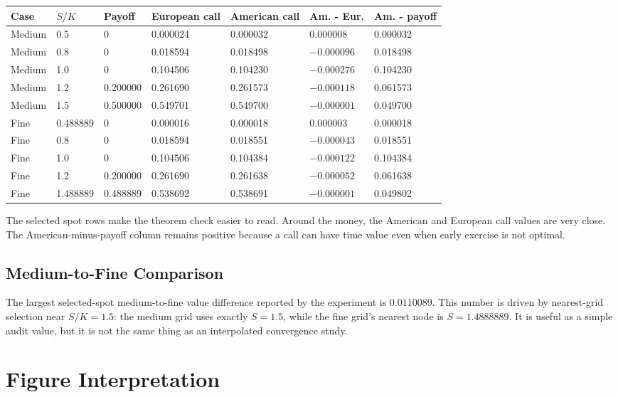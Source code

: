 \documentclass[11pt,a4paper]{article}
\begin{document}
{\footnotesize
\begin{longtable}{@{}L{0.10\textwidth}L{0.10\textwidth}L{0.12\textwidth}L{0.13\textwidth}L{0.13\textwidth}L{0.13\textwidth}L{0.13\textwidth}@{}}
\toprule
Case & \(S/K\) & Payoff & European call & American call & Am. - Eur. & Am. - payoff \\
\midrule
\endhead
Medium & 0.5 & 0 & 0.000024 & 0.000032 & 0.000008 & 0.000032 \\
Medium & 0.8 & 0 & 0.018594 & 0.018498 & \(-0.000096\) & 0.018498 \\
Medium & 1.0 & 0 & 0.104506 & 0.104230 & \(-0.000276\) & 0.104230 \\
Medium & 1.2 & 0.200000 & 0.261690 & 0.261573 & \(-0.000118\) & 0.061573 \\
Medium & 1.5 & 0.500000 & 0.549701 & 0.549700 & \(-0.000001\) & 0.049700 \\
Fine & 0.488889 & 0 & 0.000016 & 0.000018 & 0.000003 & 0.000018 \\
Fine & 0.8 & 0 & 0.018594 & 0.018551 & \(-0.000043\) & 0.018551 \\
Fine & 1.0 & 0 & 0.104506 & 0.104384 & \(-0.000122\) & 0.104384 \\
Fine & 1.2 & 0.200000 & 0.261690 & 0.261638 & \(-0.000052\) & 0.061638 \\
Fine & 1.488889 & 0.488889 & 0.538692 & 0.538691 & \(-0.000001\) & 0.049802 \\
\bottomrule
\end{longtable}
}

The selected spot rows make the theorem check easier to read. Around the money, the American and
European call values are very close. The American-minus-payoff column remains positive because a
call can have time value even when early exercise is not optimal.

\subsection{Medium-to-Fine Comparison}

The largest selected-spot medium-to-fine value difference reported by the experiment is
\(0.0110089\). This number is driven by nearest-grid selection near \(S/K=1.5\): the medium grid
uses exactly \(S=1.5\), while the fine grid's nearest node is \(S=1.4888889\). It is useful as a
simple audit value, but it is not the same thing as an interpolated convergence study.

\section{Figure Interpretation}
\end{document}
